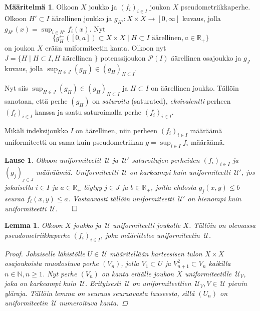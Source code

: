 \documentclass[12pt,a4paper,leqno]{report}
\newcommand{\R}{\mathbb{R}}
\newcommand{\N}{\mathbb{N}}
\newcommand{\U}{\,\mathcal{U}}
\newcommand{\Pot}{\mathcal{P}}
\theoremstyle{plain}
\newtheorem{lause}[equation]{Lause}
\newtheorem{lem}[equation]{Lemma}
\theoremstyle{definition}
\newtheorem{maar}[equation]{Määritelmä}
\theoremstyle{remark}
\begin{document}
\begin{maar}
Olkoon $X$ joukko ja $(f_i)_{i\in I} $ joukon $X$ pseudometriikkaperhe. 
Olkoon $H'\subset I$ äärellinen joukko ja $g_{H'}\colon X\times X\rightarrow [0,\infty]$ kuvaus, 
jolla $g_{H'}(x)=\sup_{i\in H'}f_i(x)$.
Nyt 
$$\{g_{H}^\leftarrow ([0,a])\subset X\times X\mid H\subset I \text{ äärellinen}, a\in\R_+ \}$$
on joukon $X$ erään uniformiteetin kanta. 
Olkoon nyt $J=\{H\mid H\subset I, H\text{ äärellinen }\}$ 
potenssijoukon $\Pot(I)$ äärellinen osajoukko ja $g_{J}$ kuvaus, 
jolla $\sup_{H\in J}(g_H)\in (g_H)_{H\subset I} $. 

Nyt siis 
$\sup_{H\in J}(g_H)\in (g_H)_{H\subset I} $ 
ja $H\subset I$ on äärellinen joukko.
Tällöin sanotaan, että perhe $(g_H)$ on \emph{saturoitu} (saturated), 
\emph{ekvivalentti} perheen $(f_i)_{i\in I}$ kanssa 
ja saatu saturoimalla perhe $(f_i)_{i\in I}$. 

Mikäli indeksijoukko $I$ on äärellinen, niin perheen $(f_i)_{i\in I}$ määräämä 
uniformiteetti on sama kuin pseudometriikan $g=\sup_{i\in I} f_i$ määräämä.
\end{maar}
\begin{lause}\label{saturoitu}
Olkoon uniformiteetit $\U$ ja $\U'$ saturoitujen perheiden 
$(f_i)_{i\in I}$ ja $(g_j)_{j\in J}$ määräämiä. 
Uniformiteetti $\U$ on karkeampi kuin uniformiteetti $\U'$, 
jos jokaisella $i\in I$ ja $a\in\R_+$ löytyy $j\in J$ ja $b\in\R_+$, 
joilla ehdosta $g_j(x,y)\leq b$ seuraa $f_i(x,y)\leq a$. 
Vastaavasti tällöin uniformiteetti $\U'$ on hienompi kuin uniformiteetti $\U$.$\qed$
\end{lause}
\begin{lem}\label{pseudo_uniformista}
Olkoon $X$ joukko ja $\U$ uniformiteetti joukolle $X$. 
Tällöin on olemassa pseudometriikkaperhe $(f_i)_{i\in I}$, joka määrittelee uniformiteetin $\U$.
\begin{proof}
Jokaiselle lähistölle $U\in\U$ määritellään karteesisen tulon $X\times X$ osajoukoista muodostuva perhe $(V_n)$, 
jolla $V_1\subset U$ ja $V_{n+1}^2\subset V_n$ kaikilla $n\in\N, n\geq 1$. 
Nyt perhe $(V_n)$ on kanta eräälle joukon $X$ uniformiteetille $\U_V$, 
joka on karkeampi kuin $\U$. 
Erityisesti $\U$ on uniformiteettien 
$\U_V,V\in\U$ pienin yläraja. %
Tällöin lemma on seuraus seuraavasta lauseesta, sillä 
$(U_n)$ on uniformiteetin $\U$ numeroituva kanta.
\end{proof}
\end{lem}
\end{document}
